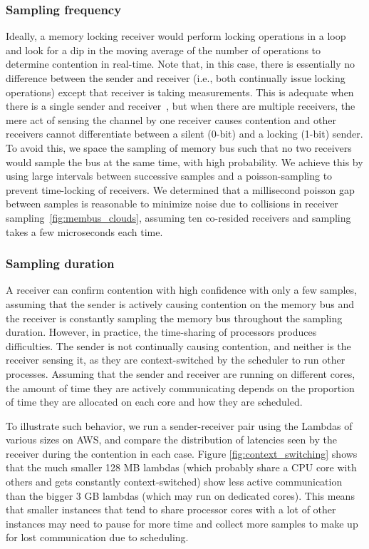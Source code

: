\subsubsection{Sampling frequency}
Ideally, a memory locking receiver would perform locking operations in a loop and 
look for a dip in the moving average of the number of operations to determine
contention in real-time. Note that, in this case, there is 
essentially no difference between the sender and receiver (i.e., both continually issue
locking operations) except that receiver is taking measurements. This is adequate when 
there is a single sender and receiver~\cite{varadarajan2015},
but when there are multiple receivers, the mere act of sensing the channel by one 
receiver causes contention and other receivers cannot differentiate between a silent (0-bit) 
and a locking (1-bit) sender. To avoid this, we space the sampling of memory bus such that 
no two receivers would sample the bus  at the same time, with high probability. 
We achieve this by using large intervals between successive samples and a poisson-sampling 
to prevent time-locking of receivers. We determined that a millisecond poisson gap between 
samples is reasonable to minimize noise due to collisions in receiver sampling~\ref{fig:membus_clouds}, 
assuming ten co-resided receivers and sampling takes a few microseconds each time.

\subsubsection{Sampling duration}
\label{sec:method:samplingdur}
A receiver can confirm contention with high confidence with only a few samples, assuming 
that the sender is actively causing contention on the memory bus
and the receiver is constantly sampling the memory bus throughout the sampling duration. 
However, in practice, the time-sharing of processors produces difficulties. 
The sender is not continually causing contention, and neither is the receiver sensing it, 
as they are context-switched by the scheduler to run other processes. 
Assuming that the sender and receiver are running on different 
cores, the amount of time they are actively communicating depends on 
the proportion of time they are allocated on each core and how they are 
scheduled. 

To illustrate such behavior, we run a sender-receiver pair using 
the Lambdas\cite{awslambda} of various sizes on AWS,
and compare the distribution of latencies seen by the receiver during the 
contention in each case. Figure \ref{fig:context_switching} shows that the much smaller 
128 MB lambdas (which probably share a CPU core with others and gets constantly context-switched) 
show less active communication than the bigger 3 GB lambdas (which may run on dedicated cores). 
This means that smaller instances that tend to share
processor cores with a lot of other instances may need to pause for more time
and collect more samples to make up for lost communication due to scheduling.



